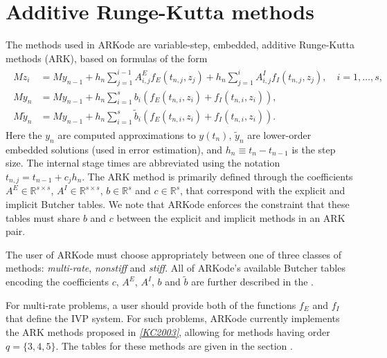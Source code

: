 \documentclass[letterpaper,10pt,english]{sphinxmanual}
\begin{document}
\section{Additive Runge-Kutta methods}
\label{Mathematics:mathematics-ark}\label{Mathematics:additive-runge-kutta-methods}
The methods used in ARKode are variable-step, embedded,
additive Runge-Kutta methods (ARK), based on formulas of the
form
\label{Mathematics:equation-ARK}\begin{gather}
\begin{split}M z_i &= M y_{n-1} + h_n \sum_{j=1}^{i-1} A^E_{i,j} f_E(t_{n,j}, z_j)
              + h_n \sum_{j=1}^{i}   A^I_{i,j} f_I(t_{n,j}, z_j),
\quad i=1,\ldots,s, \\
M y_n &= M y_{n-1} + h_n \sum_{i=1}^{s} b_i \left(f_E(t_{n,i}, z_i)
              + f_I(t_{n,i}, z_i)\right), \\
M \tilde{y}_n &= M y_{n-1} + h_n \sum_{i=1}^{s} \tilde{b}_i
    \left(f_E(t_{n,i}, z_i) + f_I(t_{n,i}, z_i)\right).\end{split}\label{Mathematics-ARK}
\end{gather}
Here the \(y_n\) are computed approximations to \(y(t_n)\),
\(\tilde{y}_n\) are lower-order embedded solutions (used in error
estimation), and \(h_n \equiv t_n - t_{n-1}\) is the step size.
The internal stage times are abbreviated using the notation
\(t_{n,j} = t_{n-1} + c_j h_n\).  The ARK method is primarily
defined through the coefficients \(A^E \in \mathbb{R}^{s\times s}\),
\(A^I \in \mathbb{R}^{s\times s}\), \(b \in \mathbb{R}^{s}\) and
\(c \in \mathbb{R}^{s}\), that correspond with the explicit and
implicit Butcher tables.  We note that ARKode enforces the constraint
that these tables must share \(b\) and \(c\) between the
explicit and implicit methods in an ARK pair.

The user of ARKode must choose appropriately between one of three
classes of methods: \emph{multi-rate}, \emph{nonstiff} and \emph{stiff}.  All of
ARKode's available Butcher tables encoding the coefficients \(c\),
\(A^E\), \(A^I\), \(b\) and \(\tilde{b}\) are further
described in the {\hyperref[Butcher:butcher]{\emph{}}}.

For multi-rate problems, a user should provide both of the functions
\(f_E\) and \(f_I\) that define the IVP system.  For such
problems, ARKode currently implements the ARK methods proposed in
\label{Mathematics:id1}{\hyperref[References:kc2003]{\emph{{[}KC2003{]}}}}, allowing for methods having order \(q = \{3,4,5\}\).
The tables for these methods are given in the section
{\hyperref[Butcher:butcher-additive]{\emph{}}}.
\end{document}
